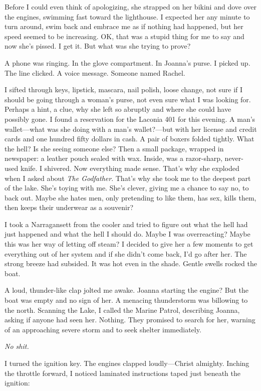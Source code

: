 Before I could even think of apologizing, she strapped on her bikini and
dove over the engines, swimming fast toward the lighthouse. I expected
her any minute to turn around, swim back and embrace me as if nothing
had happened, but her speed seemed to be increasing. OK, that was a
stupid thing for me to say and now she's pissed. I get it. But what was
she trying to prove?

A phone was ringing. In the glove compartment. In Joanna's purse. I
picked up. The line clicked. A voice message. Someone named Rachel.

I sifted through keys, lipstick, mascara, nail polish, loose change, not
sure if I should be going through a woman's purse, not even sure what I
was looking for. Perhaps a hint, a clue, why she left so abruptly and
where she could have possibly gone. I found a reservation for the
Laconia 401 for this evening. A man's wallet---what was she doing with a
man's wallet?---but with her license and credit cards and one hundred
fifty dollars in cash. A pair of boxers folded tightly. What the hell?
Is she seeing someone else? Then a small package, wrapped in newspaper:
a leather pouch sealed with wax. Inside, was a razor-sharp, never-used
knife. I shivered. Now everything made sense. That's why she exploded
when I asked about \emph{The Godfather}. That's why she took me to the
deepest part of the lake. She's toying with me. She's clever, giving me
a chance to say no, to back out. Maybe she hates men, only pretending to
like them, has sex, kills them, then keeps their underwear as a
souvenir?

I took a Narragansett from the cooler and tried to figure out what the
hell had just happened and what the hell I should do. Maybe I was
overreacting? Maybe this was her way of letting off steam? I decided to
give her a few moments to get everything out of her system and if she
didn't come back, I'd go after her. The strong breeze had subsided. It
was hot even in the shade. Gentle swells rocked the boat.

A loud, thunder-like clap jolted me awake. Joanna starting the engine?
But the boat was empty and no sign of her. A menacing thunderstorm was
billowing to the north. Scanning the Lake, I called the Marine Patrol,
describing Joanna, asking if anyone had seen her. Nothing. They promised
to search for her, warning of an approaching severe storm and to seek
shelter immediately.

\emph{No shit.}

I turned the ignition key. The engines clapped loudly---Christ almighty.
Inching the throttle forward, I noticed laminated instructions taped
just beneath the ignition:

